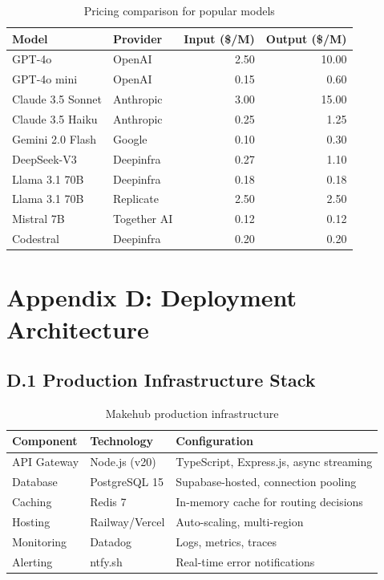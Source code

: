 \documentclass[english]{article}
\begin{document}
\begin{table}[H]
\centering
\caption{Pricing comparison for popular models}
\begin{tabular}{|l|l|r|r|}
\hline
\textbf{Model} & \textbf{Provider} & \textbf{Input (\$/M)} & \textbf{Output (\$/M)} \\
\hline
GPT-4o & OpenAI & 2.50 & 10.00 \\
GPT-4o mini & OpenAI & 0.15 & 0.60 \\
Claude 3.5 Sonnet & Anthropic & 3.00 & 15.00 \\
Claude 3.5 Haiku & Anthropic & 0.25 & 1.25 \\
Gemini 2.0 Flash & Google & 0.10 & 0.30 \\
DeepSeek-V3 & Deepinfra & 0.27 & 1.10 \\
Llama 3.1 70B & Deepinfra & 0.18 & 0.18 \\
Llama 3.1 70B & Replicate & 2.50 & 2.50 \\
Mistral 7B & Together AI & 0.12 & 0.12 \\
Codestral & Deepinfra & 0.20 & 0.20 \\
\hline
\end{tabular}
\end{table}

\newpage
\section*{Appendix D: Deployment Architecture}

\subsection*{D.1 Production Infrastructure Stack}

\begin{table}[H]
\centering
\caption{Makehub production infrastructure}
\begin{tabular}{|l|l|p{7cm}|}
\hline
\textbf{Component} & \textbf{Technology} & \textbf{Configuration} \\
\hline
API Gateway & Node.js (v20) & TypeScript, Express.js, async streaming \\
Database & PostgreSQL 15 & Supabase-hosted, connection pooling \\
Caching & Redis 7 & In-memory cache for routing decisions \\
Hosting & Railway/Vercel & Auto-scaling, multi-region \\
Monitoring & Datadog & Logs, metrics, traces \\
Alerting & ntfy.sh & Real-time error notifications \\
\hline
\end{tabular}
\end{table}
\end{document}
